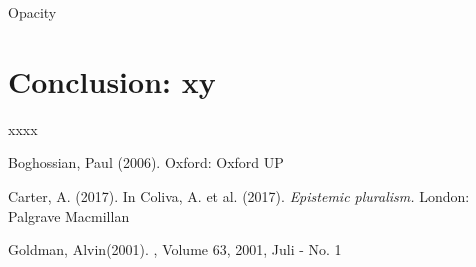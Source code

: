 \documentclass{article}
\begin{document}
Opacity
\newpage

\section*{Conclusion: xy}
xxxx

\newpage
\begin{thebibliography}{1}

Boghossian, Paul (2006).
\newblock Oxford: Oxford UP

Carter, A. (2017).
\newblock In Coliva, A. et al. (2017). {\em Epistemic pluralism.}
\newblock London: Palgrave Macmillan

Goldman, Alvin(2001).
, Volume 63, 2001, Juli - No. 1




\end{thebibliography}
\end{document}

